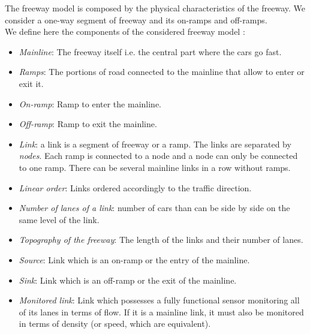 The freeway model is composed by the physical characteristics of the freeway.
We consider a one-way segment of freeway and its on-ramps and off-ramps.\\
We define here the components of the considered freeway model :
\begin{itemize}
	\item \emph{Mainline}: The freeway itself i.e. the central part where the cars go fast.
	\item \emph{Ramps}: The portions of road connected to the mainline that allow to enter or exit it.
	\item \emph{On-ramp}: Ramp to enter the mainline.
	\item \emph{Off-ramp}: Ramp to exit the mainline.
	\item \emph{Link}: a link is a segment of freeway or a ramp. The links are separated by \emph{nodes}. Each ramp is connected to a node and a node can only be connected to one ramp. There can be several mainline links in a row without ramps.
	\item \emph{Linear order}: Links ordered accordingly to the traffic direction.
	\item \emph{Number of lanes of a link}: number of cars than can be side by side on the same level of the link.
	\item \emph{Topography of the freeway}: The length of the links and their number of lanes.
	\item \emph{Source}: Link which is an on-ramp or the entry of the mainline.
	\item \emph{Sink}: Link which is an off-ramp or the exit of the mainline.
	\item \emph{Monitored link}: Link which possesses a fully functional sensor monitoring all of its lanes in terms of flow. If it is a mainline link, it must also be monitored in terms of density (or speed, which are equivalent).
\end{itemize}



